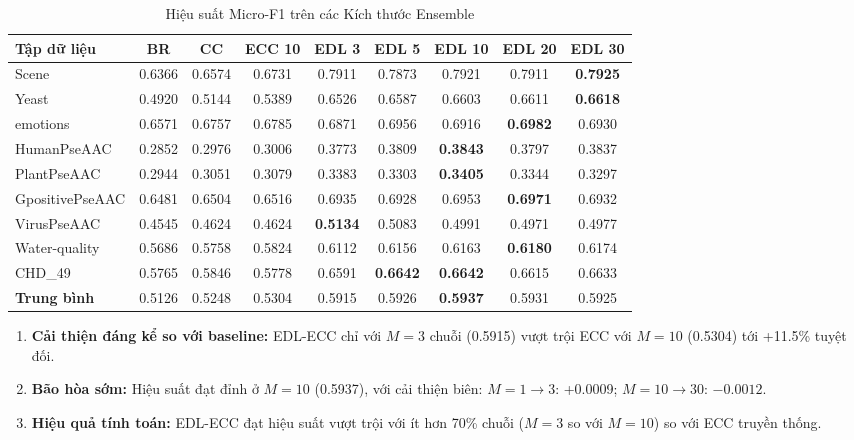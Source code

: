 \documentclass[conference]{IEEEtran}
\begin{document}
\begin{table}[t]
\centering
\caption{Hiệu suất Micro-F1 trên các Kích thước Ensemble}
\label{tab:ensemble_size}
\small
\begin{tabular}{lcccccccc}
\toprule
\textbf{Tập dữ liệu} & \textbf{BR} & \textbf{CC} & \textbf{ECC 10} & \textbf{EDL 3} & \textbf{EDL 5} & \textbf{EDL 10} & \textbf{EDL 20} & \textbf{EDL 30} \\
\midrule
Scene & 0.6366 & 0.6574 & 0.6731 & 0.7911 & 0.7873 & 0.7921 & 0.7911 & \textbf{0.7925} \\
Yeast & 0.4920 & 0.5144 & 0.5389 & 0.6526 & 0.6587 & 0.6603 & 0.6611 & \textbf{0.6618} \\
emotions & 0.6571 & 0.6757 & 0.6785 & 0.6871 & 0.6956 & 0.6916 & \textbf{0.6982} & 0.6930 \\
HumanPseAAC & 0.2852 & 0.2976 & 0.3006 & 0.3773 & 0.3809 & \textbf{0.3843} & 0.3797 & 0.3837 \\
PlantPseAAC & 0.2944 & 0.3051 & 0.3079 & 0.3383 & 0.3303 & \textbf{0.3405} & 0.3344 & 0.3297 \\
GpositivePseAAC & 0.6481 & 0.6504 & 0.6516 & 0.6935 & 0.6928 & 0.6953 & \textbf{0.6971} & 0.6932 \\
VirusPseAAC & 0.4545 & 0.4624 & 0.4624 & \textbf{0.5134} & 0.5083 & 0.4991 & 0.4971 & 0.4977 \\
Water-quality & 0.5686 & 0.5758 & 0.5824 & 0.6112 & 0.6156 & 0.6163 & \textbf{0.6180} & 0.6174 \\
CHD\_49 & 0.5765 & 0.5846 & 0.5778 & 0.6591 & \textbf{0.6642} & \textbf{0.6642} & 0.6615 & 0.6633 \\
\midrule
\textbf{Trung bình} & 0.5126 & 0.5248 & 0.5304 & 0.5915 & 0.5926 & \textbf{0.5937} & 0.5931 & 0.5925 \\
\bottomrule
\end{tabular}
\end{table}

\begin{enumerate}
    \item \textbf{Cải thiện đáng kể so với baseline:} EDL-ECC chỉ với $M=3$ chuỗi (0.5915) vượt trội ECC với $M=10$ (0.5304) tới +11.5\% tuyệt đối.
    \item \textbf{Bão hòa sớm:} Hiệu suất đạt đỉnh ở $M=10$ (0.5937), với cải thiện biên: $M=1 \to 3$: +0.0009; $M=10 \to 30$: $-0.0012$.
    \item \textbf{Hiệu quả tính toán:} EDL-ECC đạt hiệu suất vượt trội với ít hơn 70\% chuỗi ($M=3$ so với $M=10$) so với ECC truyền thống.
\end{enumerate}
\end{document}
